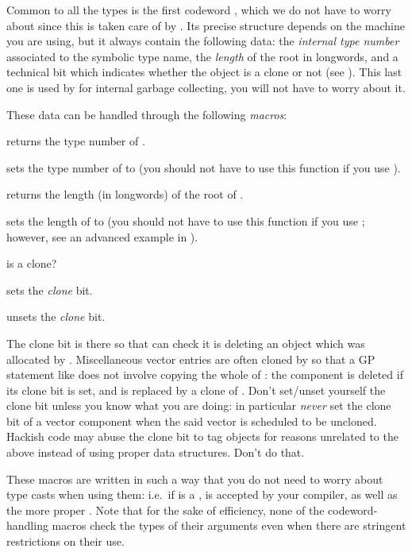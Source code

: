 Common to all the types is the first codeword , which we do not
have to worry about since this is taken care of by . Its precise
structure depends on the machine you are using, but it always contain the
following data: the \emph{internal type number} associated
to the symbolic type name, the \emph{length} of the root in longwords, and a
technical bit which indicates whether the object is a clone or not (see
). This last one is used by  for internal garbage
collecting, you will not have to worry about it.

\noindent These data can be handled through the following \emph{macros}:

 returns the type number of .

 sets the type number of  to
 (you should not have to use this function if you use ).

 returns the length (in longwords) of the root of .

 sets the length of  to  (you
should not have to use this function if you use ; however, see
an advanced example in ).

 is  a clone?

 sets the \emph{clone} bit.

 unsets the \emph{clone} bit.

 The clone bit is there so that  can check
it is deleting an object which was allocated by . Miscellaneous
vector entries are often cloned by  so that a GP statement like
 does not involve copying the whole of : the component
 is deleted if its clone bit is set, and is replaced by a clone of
. Don't set/unset yourself the clone bit unless you know what you are
doing: in particular \emph{never} set the clone bit of a vector component
when the said vector is scheduled to be uncloned. Hackish code may abuse the
clone bit to tag objects for reasons unrelated to the above instead of using
proper data structures. Don't do that.

These macros are written in such a way that you do not need to worry about
type casts when using them: i.e.~if  is a , 
is accepted by your compiler, as well as the more proper .
Note that for the sake of efficiency, none of the codeword-handling macros
check the types of their arguments even when there are stringent restrictions
on their use.

